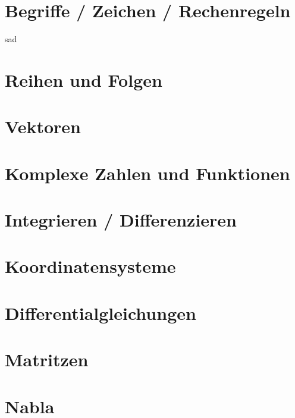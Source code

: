 \documentclass[final, 11pt]{article}
\begin{document}
  

\section{Begriffe / Zeichen / Rechenregeln}  


sad
\section{Reihen und Folgen}


\section{Vektoren}


\section{Komplexe Zahlen und Funktionen}


\section{Integrieren / Differenzieren}


\section{Koordinatensysteme}


\section{Differentialgleichungen}


\newpage
\section{Matritzen}


\section{Nabla}


\newpage
\printbibliography{}
\end{document}
